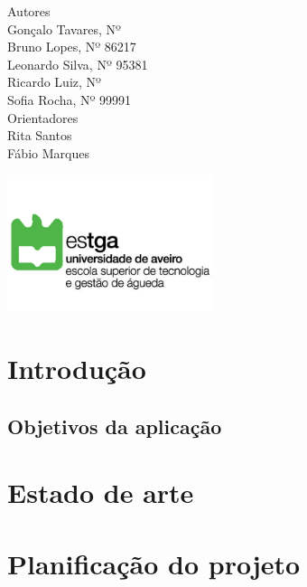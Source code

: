 \documentclass[11pt, twoside]{report}
\begin{document}
\begin{titlepage}
		
		
		\large
		Autores\\
		Gonçalo Tavares, Nº   \\
		Bruno Lopes, Nº 86217 \\
		Leonardo Silva, Nº 95381 \\
		Ricardo Luiz, Nº  \\
		Sofia Rocha, Nº 99991 \\
		
		\vspace{1cm}
		Orientadores\\
		Rita Santos \\
		Fábio Marques\\
		\vspace{4cm}
		
		\centering
		\includegraphics[width=6cm]{logoestga}
		
	\end{titlepage}

	\newpage
	\setcounter{page}{1}%
	\tableofcontents %
	\thispagestyle{plain}%
	\thispagestyle{empty}%
	\newpage
	\listoftables %
	\newpage
	\listoffigures %
	
	
	
	
	\newpage
	
	\chapter{Introdução}
	\section{Objetivos da aplicação}
	
	
	\chapter{Estado de arte}
	\chapter{Planificação do projeto}
\end{document}
